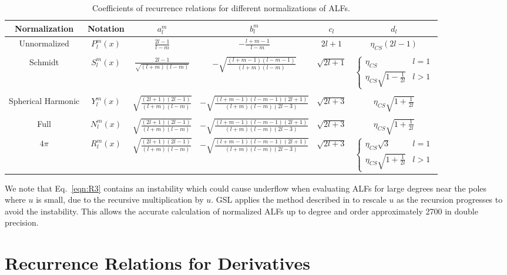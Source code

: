 \documentclass[12pt]{article}
\begin{document}
\begin{table}[ht]
\centering
\footnotesize
\caption{Coefficients of recurrence relations for different normalizations of ALFs.}
\begin{tabular}{cccccc}
\toprule
Normalization & Notation & $a_l^m$ & $b_l^m$ & $c_l$ & $d_l$ \\
\midrule
Unnormalized & $P_l^m(x)$ & $\frac{2l-1}{l-m}$ & $-\frac{l+m-1}{l-m}$ & $2l+1$ & $\eta_{CS} \left( 2l-1 \right)$ \\
\\
Schmidt & $S_l^m(x)$ & $\frac{2l-1}{\sqrt{(l+m)(l-m)}}$ & $-\sqrt{\frac{(l+m-1)(l-m-1)}{(l+m)(l-m)}}$ & $\sqrt{2l+1}$ & $\left\{ \begin{array}{cc} \eta_{CS} & l = 1 \\ \eta_{CS} \sqrt{1 - \frac{1}{2l}} & l > 1 \end{array} \right.$ \\
\\
Spherical Harmonic & $Y_l^m(x)$ & $\sqrt{\frac{(2l+1)(2l-1)}{(l+m)(l-m)}}$ & $-\sqrt{\frac{(l+m-1)(l-m-1)(2l+1)}{(l+m)(l-m)(2l-3)}}$ & $\sqrt{2l+3}$ & $\eta_{CS} \sqrt{1 + \frac{1}{2l}}$ \\
\\
Full & $N_l^m(x)$ & $\sqrt{\frac{(2l+1)(2l-1)}{(l+m)(l-m)}}$ & $-\sqrt{\frac{(l+m-1)(l-m-1)(2l+1)}{(l+m)(l-m)(2l-3)}}$ & $\sqrt{2l+3}$ & $\eta_{CS} \sqrt{1 + \frac{1}{2l}}$ \\
$4\pi$ & $R_l^m(x)$ & $\sqrt{\frac{(2l+1)(2l-1)}{(l+m)(l-m)}}$ & $-\sqrt{\frac{(l+m-1)(l-m-1)(2l+1)}{(l+m)(l-m)(2l-3)}}$ & $\sqrt{2l+3}$ & $\left\{ \begin{array}{cc} \eta_{CS} \sqrt{3} & l = 1 \\ \eta_{CS} \sqrt{1 + \frac{1}{2l}} & l > 1 \end{array} \right.$ \\
\bottomrule
\end{tabular}
\label{tab:recurrence}
\end{table}

We note that Eq.~\eqref{eqn:R3} contains an instability which
could cause underflow when evaluating ALFs for large degrees
near the poles where $u$ is small, due to the recursive multiplication
by $u$. GSL applies the method described in \citet{holmes2002}
to rescale $u$ as the recursion progresses to avoid the instability.
This allows the accurate calculation of normalized ALFs up to degree
and order approximately 2700 in double precision.

\section{Recurrence Relations for Derivatives}
\end{document}
